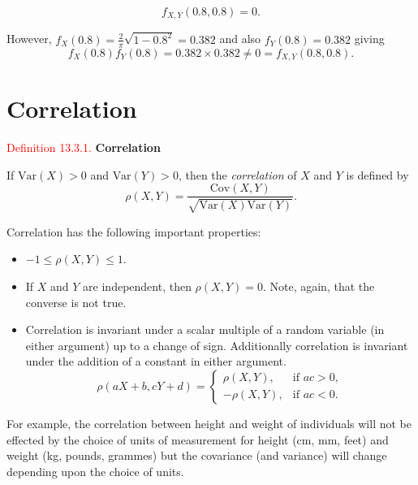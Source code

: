 \documentclass[
]{book}
\providecommand{\tightlist}{%
  \setlength{\itemsep}{0pt}\setlength{\parskip}{0pt}}
\begin{document}
\[ f_{X,Y} (0.8,0.8) =0.\]

However, \(f_X(0.8) = \frac{2}{\pi} \sqrt{1-0.8^2} = 0.382\) and also \(f_Y(0.8)=0.382\) giving\\

\[ f_X(0.8) f_Y(0.8) =0.382 \times 0.382 \neq 0 =  f_{X,Y} (0.8,0.8). \]

\hfill\break

\hypertarget{Correlation:Correlation}{%
\section{Correlation}\label{Correlation:Correlation}}

\leavevmode{}%
\textcolor{red}{Definition 13.3.1.}
{\textbf{Correlation}}

If \(\text{Var}(X)>0\) and \(\text{Var}(Y)>0\), then the \emph{correlation} of \(X\) and \(Y\) is defined by\\

\[\rho(X,Y) = \frac{\text{Cov}(X,Y)}{\sqrt{\text{Var}(X)\text{Var}(Y)}}.\]

Correlation has the following important properties:

\begin{itemize}
\tightlist
\item
  \(-1 \leq \rho(X,Y) \leq 1\).\\
\item
  If \(X\) and \(Y\) are independent, then \(\rho(X,Y)=0\). Note, again, that the converse is not true.\\
\item
  Correlation is invariant under a scalar multiple of a random variable (in either argument) up to a change of sign. Additionally correlation is invariant under the addition of a constant in either argument.\\

  \[ \rho (aX+b,cY+d) = \begin{cases} \rho(X,Y), & \text{if } ac>0, \\[3pt]
  -\rho(X,Y), & \text{if } ac<0. \end{cases} \]
\end{itemize}

For example, the correlation between height and weight of individuals will not be effected by the choice of units of measurement for height (cm, mm, feet) and weight (kg, pounds, grammes) but the covariance (and variance) will change depending upon the choice of units.
\end{document}
